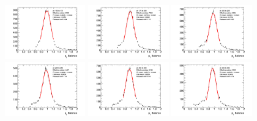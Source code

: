 \begin{figure}[t]
    \centering
    \includegraphics[width=0.31\textwidth]{plots/insitu/fits_data_zmm_nominal/Zmmjet_Nominal_bin2.png}
    \includegraphics[width=0.31\textwidth]{plots/insitu/fits_data_zmm_nominal/Zmmjet_Nominal_bin3.png}
    \includegraphics[width=0.31\textwidth]{plots/insitu/fits_data_zmm_nominal/Zmmjet_Nominal_bin4.png}
    \includegraphics[width=0.31\textwidth]{plots/insitu/fits_data_zmm_nominal/Zmmjet_Nominal_bin5.png}
    \includegraphics[width=0.31\textwidth]{plots/insitu/fits_data_zmm_nominal/Zmmjet_Nominal_bin6.png}
    \includegraphics[width=0.31\textwidth]{plots/insitu/fits_data_zmm_nominal/Zmmjet_Nominal_bin7.png}

\end{figure}
